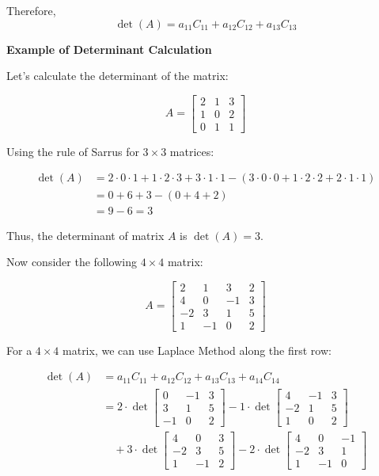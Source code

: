 Therefore,
\[
\det(A) = a_{11}C_{11} + a_{12}C_{12} + a_{13}C_{13}
\]

\textbf{Example of Determinant Calculation}

Let's calculate the determinant of the matrix:

\[
    A =
    \begin{bmatrix}
    2 & 1 & 3 \\
    1 & 0 & 2 \\
    0 & 1 & 1
    \end{bmatrix}
\]

Using the rule of Sarrus for \(3 \times 3\) matrices:

\begin{align*}
    \det(A) &= 2 \cdot 0 \cdot 1 + 1 \cdot 2 \cdot 3 + 3 \cdot 1 \cdot 1 - (3 \cdot 0 \cdot 0 + 1 \cdot 2 \cdot 2 + 2 \cdot 1 \cdot 1) \\
    &= 0 + 6 + 3 - (0 + 4 + 2) \\
    &= 9 - 6 = 3
\end{align*}
 
Thus, the determinant of matrix \(A\) is \(\det(A) = 3\).

 Now consider the following \(4 \times 4\) matrix:

\[
    A = 
    \begin{bmatrix}
    2 & 1 & 3 & 2 \\
    4 & 0 & -1 & 3 \\
    -2 & 3 & 1 & 5 \\
    1 & -1 & 0 & 2
    \end{bmatrix}
\]

For a \(4 \times 4\) matrix, we can use Laplace Method along the first row:

\begin{align*}
    \det(A) &= a_{11}C_{11} + a_{12}C_{12} + a_{13}C_{13} + a_{14}C_{14} \\
    &= 2 \cdot \det\begin{bmatrix} 0 & -1 & 3 \\ 3 & 1 & 5 \\ -1 & 0 & 2 \end{bmatrix} 
    - 1 \cdot \det\begin{bmatrix} 4 & -1 & 3 \\ -2 & 1 & 5 \\ 1 & 0 & 2 \end{bmatrix} \\
    &\quad + 3 \cdot \det\begin{bmatrix} 4 & 0 & 3 \\ -2 & 3 & 5 \\ 1 & -1 & 2 \end{bmatrix} 
    - 2 \cdot \det\begin{bmatrix} 4 & 0 & -1 \\ -2 & 3 & 1 \\ 1 & -1 & 0 \end{bmatrix}
\end{align*}

